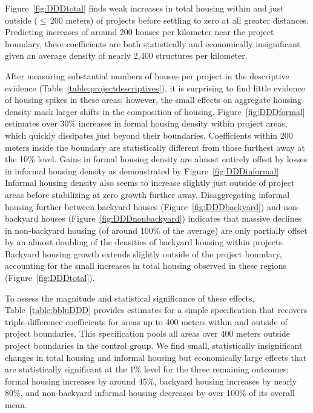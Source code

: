 \documentclass[12pt]{article}
\begin{document}
Figure~\ref{fig:DDDtotal} finds weak increases in total housing within and just outside ($\leq\,$200 meters) of projects before settling to zero at all greater distances.  Predicting increases of around 200 houses per kilometer near the project boundary, these coefficients are both statistically and economically insignificant given an average density of nearly 2,400 structures per kilometer.  

After measuring substantial numbers of houses per project in the descriptive evidence (Table~\ref{table:projectdescriptives}), it is surprising to find little evidence of housing spikes in these areas; however, the small effects on aggregate housing density mask larger shifts in the composition of housing.  Figure~\ref{fig:DDDformal} estimates over 30\% increases in formal housing density within project areas, which quickly dissipates just beyond their boundaries.  Coefficients within 200 meters inside the boundary are statistically different from those furthest away at the 10\% level.  Gains in formal housing density are almost entirely offset by losses in informal housing density as demonstrated by Figure~\ref{fig:DDDinformal}.  Informal housing density also seems to increase slightly just outside of project areas before stabilizing at zero growth further away.  Disaggregating informal housing further between backyard houses (Figure~\ref{fig:DDDbackyard}) and non-backyard houses (Figure~\ref{fig:DDDnonbackyard}) indicates that massive declines in non-backyard housing (of around 100\% of the average) are only partially offset by an almost doubling of the densities of backyard housing within projects.  Backyard housing growth extends slightly outside of the project boundary, accounting for the small increases in total housing observed in these regions (Figure~\ref{fig:DDDtotal}).

To assess the magnitude and statistical significance of these effects, Table~\ref{table:bbluDDD} provides estimates for a simple specification that recovers triple-difference coefficients for areas up to 400 meters within and outside of project boundaries.  This specification pools all areas over 400 meters outside project boundaries in the control group.  We find small, statistically insignificant changes in total housing and informal housing but economically large effects that are statistically significant at the 1\% level for the three remaining outcomes: formal housing increases by around 45\%, backyard housing increases by nearly 80\%, and non-backyard informal housing decreases by over 100\% of its overall mean.  
\end{document}
